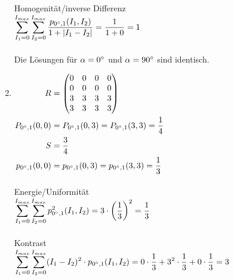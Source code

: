 \begin{enumerate}[I]
	      Homogenität/inverse Differenz\\
	      $\begin{aligned}[t]
			      \sum_{I_1=0}^{I_{max}}\sum_{I_2=0}^{I_{max}}  \frac{p_{0\degree,1}(I_1,I_2)}{1 + |I_1-I_2|}
			      = \frac{1}{1 + 0} = 1 \\
		      \end{aligned}$\\\\

	      Die Lösungen für $\alpha = 0\degree$ und $\alpha = 90\degree$ sind identisch.
	\item $\begin{aligned}[t]
			      R                   & = \begin{pmatrix}
				                              0 & 0 & 0 & 0 \\
				                              0 & 0 & 0 & 0 \\
				                              3 & 3 & 3 & 3 \\
				                              3 & 3 & 3 & 3 \\
			                              \end{pmatrix} \\
			      P_{0\degree,1}(0,0) & =
			      P_{0\degree,1}(0,3)  =
			      P_{0\degree,1}(3,3)  = \frac{1}{4}     \\
			      S                   & = \frac{3}{4}    \\
			      p_{0\degree,1}(0,0) & =
			      p_{0\degree,1}(0,3)  =
			      p_{0\degree,1}(3,3)  = \frac{1}{3}     \\
		      \end{aligned}$\\\\

	      Energie/Uniformität\\
	      $\begin{aligned}[t]
			      \sum_{I_1=0}^{I_{max}}\sum_{I_2=0}^{I_{max}} p^2_{0\degree,1}(I_1,I_2)
			      = 3\cdot \left(\frac{1}{3}\right)^2 = \frac{1}{3} \\
		      \end{aligned}$\\\\

	      Kontrast\\
	      $\begin{aligned}[t]
			      \sum_{I_1=0}^{I_{max}}\sum_{I_2=0}^{I_{max}} (I_1-I_2)^2 \cdot p_{0\degree,1}(I_1,I_2)
			      =0 \cdot \frac{1}{3} + 3^2 \cdot \frac{1}{3} + 0 \cdot \frac{1}{3}  = 3 \\
		      \end{aligned}$\\\\


\end{enumerate}
